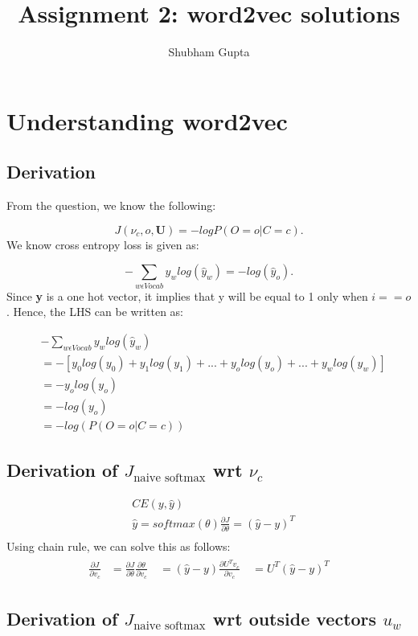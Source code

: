\documentclass[a4paper]{article}
\title{Assignment 2: word2vec solutions}
\author{Shubham Gupta}
\begin{document}
\maketitle
\section{Understanding word2vec}
\subsection{Derivation}
From the question, we know the following:

\[
    J(\nu_c, o, \textbf{U}) = -logP(O=o | C=c) 
.\] 
We know cross entropy loss is given as:

\[
    -\sum_{w \epsilon Vocab} y_wlog(\hat{y}_w) = -log(\hat{y}_o)
.\] 
Since \textbf{y} is a one hot vector, it implies that y will be equal to 1 only when $i == o$. Hence, the LHS can be written as:

\begin{equation}
\begin{split}
& - \sum_{w \epsilon Vocab} y_wlog(\hat{y}_w) \\
& = -[y_0log(y_0) + y_1log(y_1)+...+y_olog(y_o)+...+y_wlog(y_w)] \\
& = -y_olog(y_o) \\
& = -log(y_o) \\
& = -log(P(O=o|C=c))
\end{split}
\end{equation}

\subsection{Derivation of $J_ {\text{naive softmax}}$ wrt $\nu_c$}
\begin{equation}
\begin{split}
    & CE(y, \hat{y})\\
    & \hat{y} = softmax(\theta) \frac{\partial J}{\partial \theta} = (\hat{y} - y)^T \\
\end{split}
\end{equation}
Using chain rule, we can solve this as follows:
\begin{equation}
\begin{split}
    \begin{aligned} \frac{\partial J}{\partial v_c} &= \frac{\partial J}{\partial \theta} \frac{\partial \theta}{\partial v_c} \ &= (\hat{y} - y) \frac{\partial U^Tv_c}{\partial v_c} \ &= U^T(\hat{y} - y)^T \end{aligned}
\end{split}
\end{equation}

\subsection{Derivation of $J_ {\text{naive softmax}}$ wrt outside vectors $u_w$}
\end{document}
